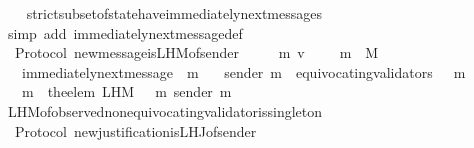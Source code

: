 \begin{isabellebody}
%
\isadelimproof
\ \ %
\endisadelimproof
%
\isatagproof
{}\isamarkupfalse%
\ strict{\isacharunderscore}subset{\isacharunderscore}of{\isacharunderscore}state{\isacharunderscore}have{\isacharunderscore}immediately{\isacharunderscore}next{\isacharunderscore}messages\isanewline
\ \ \isamarkupfalse%
\ {\isacharparenleft}simp\ add{\isacharcolon}\ immediately{\isacharunderscore}next{\isacharunderscore}message{\isacharunderscore}def{\isacharparenright}\ \ \isanewline
\ \ \isamarkupfalse%
%
\endisatagproof
{\isafoldproof}%
%
\isadelimproof
\isanewline
%
\endisadelimproof
\isanewline
\isanewline
{}\isamarkupfalse%
\ {\isacharparenleft}\ Protocol{\isacharparenright}\ new{\isacharunderscore}message{\isacharunderscore}is{\isacharunderscore}L{\isacharunderscore}H{\isacharunderscore}M{\isacharunderscore}of{\isacharunderscore}sender\ {\isacharcolon}\isanewline
\ \ {\isachardoublequoteopen}{\isasymforall}\ {\isasymsigma}\ m\ v{\isachardot}\ {\isasymsigma}\ {\isasymin}\ {\isasymSigma}\ {\isasymand}\ m\ {\isasymin}\ M\ \isanewline
\ \ {\isasymlongrightarrow}\ immediately{\isacharunderscore}next{\isacharunderscore}message\ {\isacharparenleft}{\isasymsigma}{\isacharcomma}\ m{\isacharparenright}\isanewline
\ \ {\isasymlongrightarrow}\ sender\ m\ {\isasymnotin}\ equivocating{\isacharunderscore}validators\ {\isacharparenleft}{\isasymsigma}\ {\isasymunion}\ {\isacharbraceleft}m{\isacharbraceright}{\isacharparenright}\isanewline
\ \ {\isasymlongrightarrow}\ m\ {\isacharequal}\ the{\isacharunderscore}elem\ {\isacharparenleft}L{\isacharunderscore}H{\isacharunderscore}M\ {\isacharparenleft}{\isasymsigma}\ {\isasymunion}\ {\isacharbraceleft}m{\isacharbraceright}{\isacharparenright}\ {\isacharparenleft}sender\ m{\isacharparenright}{\isacharparenright}{\isachardoublequoteclose}\isanewline
%
\isadelimproof
\ \ %
\endisadelimproof
%
\isatagproof
{}\isamarkupfalse%
\ L{\isacharunderscore}H{\isacharunderscore}M{\isacharunderscore}of{\isacharunderscore}observed{\isacharunderscore}non{\isacharunderscore}equivocating{\isacharunderscore}validator{\isacharunderscore}is{\isacharunderscore}singleton\isanewline
\ \ \isamarkupfalse%
%
\endisatagproof
{\isafoldproof}%
%
\isadelimproof
\isanewline
%
\endisadelimproof
\isanewline
{}\isamarkupfalse%
\ {\isacharparenleft}\ Protocol{\isacharparenright}\ new{\isacharunderscore}justification{\isacharunderscore}is{\isacharunderscore}L{\isacharunderscore}H{\isacharunderscore}J{\isacharunderscore}of{\isacharunderscore}sender\ {\isacharcolon}\isanewline

\end{isabellebody}
